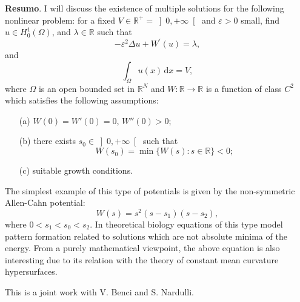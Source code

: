 	\vspace{24pt}
	
	
	
	\noindent\textbf{Resumo}.\label{pp} 
	I will discuss the existence of multiple solutions for the following nonlinear problem: for a fixed $V\in \mathds{R}^{+}=\left]0,+\infty\right[$ and $\varepsilon>0$ small, find $
	u\in H_{0}^{1}(\Omega )$, and $\lambda \in \mathds{R}$ such that$\ $ 
	\[
	-\varepsilon ^{2}\Delta u+W^{\prime }(u) =\lambda,
	\]
	and
	\[
	\int_{\Omega }u(x)\,\mathrm dx =V,\]
	where $\Omega$ is an open bounded set in $\mathds{R}^{N}$ and $W:\mathds R\to\mathds R$ is a function of class  $C^2$  which satisfies the following assumptions:
	\begin{itemize}
		\item[(a)] $W(0)=W'(0)=0$,  $W''(0)>0$;
		\item[(b)] there exists $s_0\in\left]0,+\infty\right[$ such that 
		\[W(s_0)=\min\big\{W(s):s\in\mathds{R}\big\}<0;\]
		\item[(c)] suitable growth conditions.
	\end{itemize}
	The simplest example of this type of potentials is given by the non-symmetric Allen-Cahn potential: 
	\[
	W(s)=s^2(s-s_1)(s-s_2),
	\]
	where $0<s_1<s_0<s_2$. In theoretical biology equations of this type model pattern formation related
	to solutions which are not absolute minima of the energy. From a purely mathematical viewpoint, the above equation is also interesting due to its relation with the theory of constant mean curvature hypersurfaces.
	
	\vspace*{0.5cm} \noindent This is a joint work with V. Benci and S. Nardulli. 
	
	\vspace{24pt}
	
	
